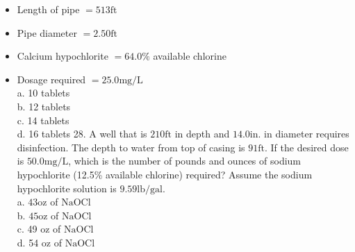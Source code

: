 \documentclass[10pt]{article}
\begin{document}
\begin{itemize}
  \item Length of pipe $=513 \mathrm{ft}$

  \item Pipe diameter $=2.50 \mathrm{ft}$

  \item Calcium hypochlorite $=64.0 \%$ available chlorine

  \item Dosage required $=25.0 \mathrm{mg} / \mathrm{L}$\\
a. 10 tablets\\
b. 12 tablets\\
c. 14 tablets\\
d. 16 tablets 28. A well that is $210 \mathrm{ft}$ in depth and $14.0 \mathrm{in}$. in diameter requires disinfection. The depth to water from top of casing is $91 \mathrm{ft}$. If the desired dose is $50.0 \mathrm{mg} / \mathrm{L}$, which is the number of pounds and ounces of sodium hypochlorite (12.5\% available chlorine) required? Assume the sodium hypochlorite solution is $9.59 \mathrm{lb} / \mathrm{gal}$.\\
a. $43 \mathrm{oz}$ of $\mathrm{NaOCl}$\\
b. $45 \mathrm{oz}$ of $\mathrm{NaOCl}$\\
c. 49 oz of $\mathrm{NaOCl}$\\
d. 54 oz of $\mathrm{NaOCl}$

\end{itemize}
\end{document}
